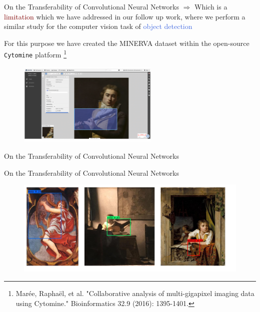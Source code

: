 \documentclass{beamer}
\begin{document}
\begin{frame}{On the Transferability of Convolutional Neural Networks}
	\bigskip
	$\Rightarrow$ Which is a \textcolor{Maroon}{limitation} which we have addressed in our follow up work, where we perform a similar study for the computer vision task of \textcolor{RoyalBlue}{object detection}

	\bigskip
	
	For this purpose we have created the MINERVA dataset within the open-source \texttt{Cytomine} platform \footnote{Marée, Raphaël, et al. "Collaborative analysis of multi-gigapixel imaging data using Cytomine." Bioinformatics 32.9 (2016): 1395-1401.}

	\begin{figure}
		\includegraphics[width=0.6\textwidth]{figures/cytomine_annotations}
	\end{figure}

\end{frame}


\begin{frame}{On the Transferability of Convolutional Neural Networks}
	\bigskip
	
\end{frame}

\begin{frame}{On the Transferability of Convolutional Neural Networks}
	\begin{figure}
		\includegraphics[width=1\textwidth]{figures/minerva}
	\end{figure}
\end{frame}
\end{document}
